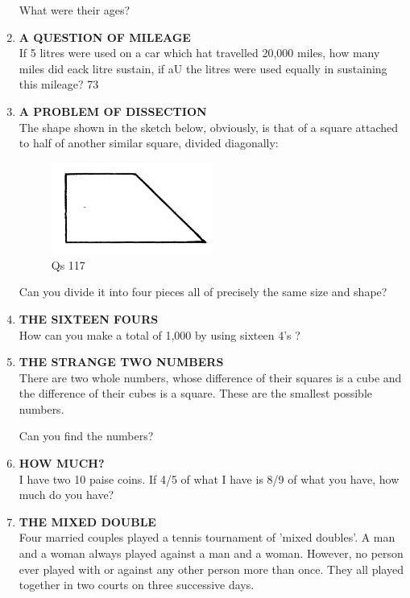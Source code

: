 \documentclass[12pt]{article}
\begin{document}
\begin{enumerate}
What  were  their  ages? 
%
\item \textbf{A  QUESTION  OF MILEAGE} \\
If 5 litres  were  used  on a car  which  hat  travelled 20,000  miles,  how  many  miles  did eack  litre  sustain,  if aU the litres  were  used  equally  in sustaining  this mileage? 
73 
%
\item \textbf{A  PROBLEM  OF  DISSECTION} \\ 
The shape  shown  in the  sketch  below,  obviously,  is that of a square  attached  to half  of another  similar  square, divided  diagonally: 

\begin{figure}[h]
\begin{center}
\includegraphics[width=0.5\textwidth]{sdevi_q117.png}
\caption{ Qs 117}
\end{center}
\end{figure}


Can you divide  it into  four  pieces  all of precisely  the same  size and shape? 
%
\item \textbf{THE SIXTEEN  FOURS} \\ 
How  can  you  make  a total  of 1,000  by using  sixteen 4's ? 

\item \textbf{THE STRANGE  TWO  NUMBERS} \\
There  are  two  whole  numbers,  whose  difference  of their squares  is a cube  and the  difference  of their  cubes is a square.  These  are the  smallest  possible  numbers. 

Can you  find  the numbers? 


\item \textbf{HOW MUCH?} \\
I have  two 10 paise  coins.  If 4/5 of  what  I have  is 8/9
of what  you have,  how  much  do you have? 

\item \textbf{THE MIXED  DOUBLE} \\ 
Four  married  couples  played  a tennis  tournament  of 'mixed  doubles'.  A man  and  a woman  always  played against  a man  and a woman.  However,  no person  ever played  with  or against  any other  person  more  than  once. They  all played  together  in two courts  on three  successive days. 


\end{enumerate}
\end{document}
